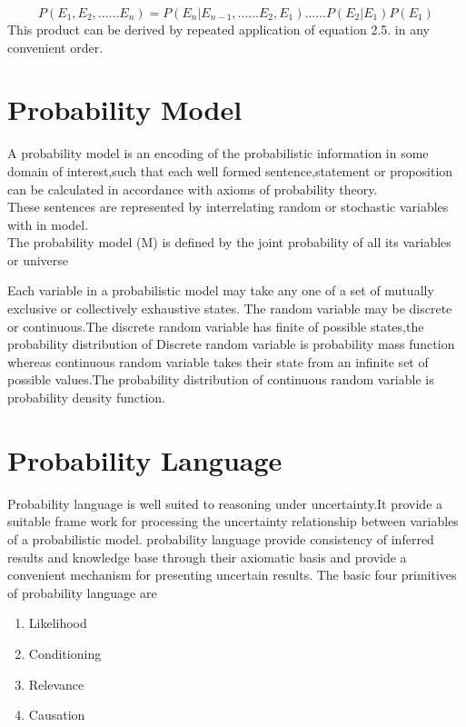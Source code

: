 \begin{equation}
    P(E{_1},E{_2},......E{_n})=P(E_{n}|E_{n-1},......E{_2},E{_1})......P(E{_2}|E{_1})P(E{_1})
\end{equation}
This product can be derived by repeated application of equation 2.5. in any convenient order.
\section{Probability Model}

A probability model is an encoding of the probabilistic information in some domain of interest,such that each well formed sentence,statement or proposition can be calculated in accordance with axioms of probability theory.
\\These sentences are represented by interrelating random or stochastic variables with in model.
\\The  probability model (M) is defined by the joint probability of all its variables or universe


Each variable in a probabilistic model may take any one of a set of mutually exclusive or collectively
exhaustive states.
The random variable may be discrete or continuous.The discrete random variable has finite of possible states,the probability distribution of Discrete random variable is probability mass function whereas continuous random variable takes their state from an infinite set of possible values.The probability distribution of continuous random variable is probability density function.
\section{Probability Language}

Probability language is well suited to reasoning under uncertainty.It provide a suitable frame work for processing the uncertainty relationship between variables of a probabilistic model.
probability language provide consistency of inferred results and knowledge base through their axiomatic basis and provide a convenient mechanism for presenting uncertain results.
The basic four primitives of probability language are\begin{enumerate}
                                                      \item Likelihood
                                                      \item Conditioning
                                                      \item Relevance
                                                     \item Causation
                                                     \end{enumerate}

